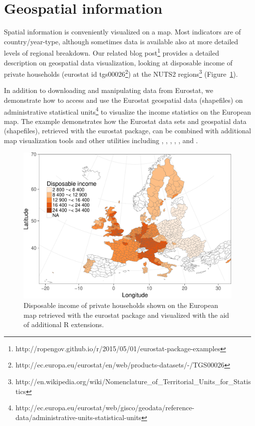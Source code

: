 \section{Geospatial information}

Spatial information is conveniently visualized on a map. Most
indicators are of country/year-type, although sometimes data is
available also at more detailed levels of regional breakdown. Our
related blog
post\footnote{http://ropengov.github.io/r/2015/05/01/eurostat-package-examples}
provides a detailed description on geospatial data visualization,
looking at disposable income of private households (eurostat id
tgs00026\footnote{http://ec.europa.eu/eurostat/en/web/products-datasets/-/TGS00026})
at the NUTS2
regions\footnote{http://en.wikipedia.org/wiki/Nomenclature\_of\_Territorial\_Units\_for\_Statistics}
(Figure~\ref{fig:mapexample}).

In addition to downloading and manipulating data from Eurostat, we
demonstrate how to access and use the Eurostat geospatial data
(shapefiles) on administrative statistical
units\footnote{http://ec.europa.eu/eurostat/web/gisco/geodata/reference-data/administrative-units-statistical-units}
to visualize the income statistics on the European map. The example
demonstrates how the Eurostat data sets and geospatial data
(shapefiles), retrieved with the eurostat package, can be combined
with additional map visualization tools and other utilities including
 \citep{grid},  \citep{maptools},  \citep{rgdal},
 \citep{rgeos},  \citep{scales}, and
 \citep{stringr}.


\begin{figure}
\begin{center}
\includegraphics{2015-manu-mapexample-1}
\caption{Disposable income of private households shown on the European map retrieved with the eurostat package and visualized with the aid of additional R extensions.}
\label{fig:mapexample}
\end{center}
\end{figure}




